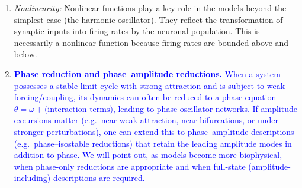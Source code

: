\documentclass[12pt]{article}
\numberwithin{equation}{section}
\newcommand{\rev}[1]{\textcolor{blue}{#1}}
\begin{document}
\begin{enumerate}
\begin{enumerate}
\item \emph{Nonlinearity:} Nonlinear functions play a key role in the models beyond the simplest case (the harmonic oscillator). They reflect the transformation of synaptic inputs into firing rates by the neuronal population. This is necessarily a nonlinear function because firing rates are bounded above and below. 

\item \rev{\textbf{Phase reduction and phase--amplitude reductions.}
When a system possesses a stable limit cycle with strong attraction and is subject to weak
forcing/coupling, its dynamics can often be reduced to a phase equation
$\dot{\theta}=\omega+\text{(interaction terms)}$, leading to phase-oscillator networks.
If amplitude excursions matter (e.g.\ near weak attraction, near bifurcations, or under
stronger perturbations), one can extend this to phase--amplitude descriptions (e.g.\
phase--isostable reductions) that retain the leading amplitude modes in addition to phase.
We will point out, as models become more biophysical, when phase-only reductions are
appropriate and when full-state (amplitude-including) descriptions are required.}

\end{enumerate}
\end{enumerate}
\bigskip
\end{document}
